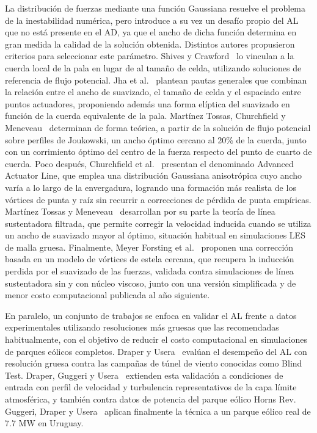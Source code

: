 La distribución de fuerzas mediante una función Gaussiana resuelve el problema de la inestabilidad numérica, pero introduce a su vez un desafío propio del AL que no está presente en el AD, ya que el ancho de dicha función determina en gran medida la calidad de la solución obtenida. Distintos autores propusieron criterios para seleccionar este parámetro. Shives y Crawford~\cite{shives2012} lo vinculan a la cuerda local de la pala en lugar de al tamaño de celda, utilizando soluciones de referencia de flujo potencial. Jha et al.~\cite{jha2014} plantean pautas generales que combinan la relación entre el ancho de suavizado, el tamaño de celda y el espaciado entre puntos actuadores, proponiendo además una forma elíptica del suavizado en función de la cuerda equivalente de la pala. Martínez Tossas, Churchfield y Meneveau~\cite{martinezTossas2017} determinan de forma teórica, a partir de la solución de flujo potencial sobre perfiles de Joukowski, un ancho óptimo cercano al 20\% de la cuerda, junto con un corrimiento óptimo del centro de la fuerza respecto del punto de cuarto de cuerda. Poco después, Churchfield et al.~\cite{churchfield2017} presentan el denominado Advanced Actuator Line, que emplea una distribución Gaussiana anisotrópica cuyo ancho varía a lo largo de la envergadura, logrando una formación más realista de los vórtices de punta y raíz sin recurrir a correcciones de pérdida de punta empíricas. Martínez Tossas y Meneveau~\cite{martinezTossas2019} desarrollan por su parte la teoría de línea sustentadora filtrada, que permite corregir la velocidad inducida cuando se utiliza un ancho de suavizado mayor al óptimo, situación habitual en simulaciones LES de malla gruesa. Finalmente, Meyer Forsting et al.~\cite{meyerforsting2019,meyerforsting2020} proponen una corrección basada en un modelo de vórtices de estela cercana, que recupera la inducción perdida por el suavizado de las fuerzas, validada contra simulaciones de línea sustentadora sin y con núcleo viscoso, junto con una versión simplificada y de menor costo computacional publicada al año siguiente.

En paralelo, un conjunto de trabajos se enfoca en validar el AL frente a datos experimentales utilizando resoluciones más gruesas que las recomendadas habitualmente, con el objetivo de reducir el costo computacional en simulaciones de parques eólicos completos. Draper y Usera~\cite{draper2015} evalúan el desempeño del AL con resolución gruesa contra las campañas de túnel de viento conocidas como Blind Test. Draper, Guggeri y Usera~\cite{draper2016} extienden esta validación a condiciones de entrada con perfil de velocidad y turbulencia representativos de la capa límite atmosférica, y también contra datos de potencia del parque eólico Horns Rev. Guggeri, Draper y Usera~\cite{guggeri2017} aplican finalmente la técnica a un parque eólico real de 7.7 MW en Uruguay.

